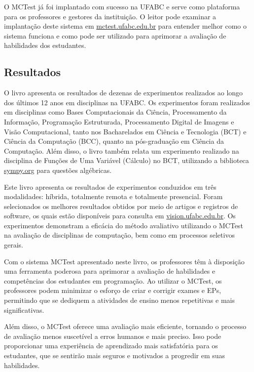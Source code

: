 O MCTest já foi implantado com sucesso na UFABC e serve como plataforma para os professores e gestores da instituição. O leitor pode examinar a implantação deste sistema em \href{http://mctest.ufabc.edu.br}{mctest.ufabc.edu.br} para entender melhor como o sistema funciona e como pode ser utilizado para aprimorar a avaliação de habilidades dos estudantes.

\subsection{Resultados} 
O livro apresenta os resultados de dezenas de experimentos realizados ao longo dos últimos 12 anos em disciplinas na UFABC. Os experimentos foram realizados em disciplinas como Bases Computacionais da Ciência, Processamento da Informação, Programação Estruturada, Processamento Digital de Imagens e Visão Computacional, tanto nos Bacharelados em Ciência e Tecnologia (BCT) e Ciência da Computação (BCC), quanto na pós-graduação em Ciência da Computação. Além disso, o livro também relata um experimento realizado na disciplina de Funções de Uma Variável (Cálculo) no BCT, utilizando a biblioteca \href{http://sympy.org}{sympy.org} para questões algébricas.

Este livro apresenta os resultados de experimentos conduzidos em três modalidades: híbrida, totalmente remota e totalmente presencial. Foram selecionados os melhores resultados obtidos por meio de artigos e registros de software, os quais estão disponíveis para consulta em \href{http://vision.ufabc.edu.br}{vision.ufabc.edu.br}. Os experimentos demonstram a eficácia do método avaliativo utilizando o MCTest na avaliação de disciplinas de computação, bem como em processos seletivos gerais.

Com o sistema MCTest apresentado neste livro, os professores têm à disposição uma ferramenta poderosa para aprimorar a avaliação de habilidades e competências dos estudantes em programação. Ao utilizar o MCTest, os professores podem minimizar o esforço de criar e corrigir exames e EPs, permitindo que se dediquem a atividades de ensino menos repetitivas e mais significativas.

Além disso, o MCTest oferece uma avaliação mais eficiente, tornando o processo de avaliação menos suscetível a erros humanos e mais preciso. Isso pode proporcionar uma experiência de aprendizado mais satisfatória para os estudantes, que se sentirão mais seguros e motivados a progredir em suas habilidades.
 

